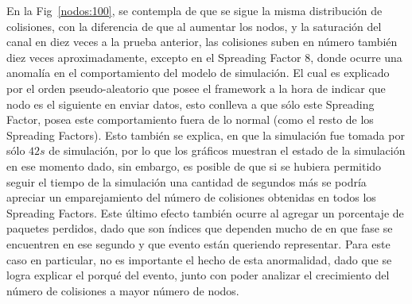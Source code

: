 \begin{justify}
En la Fig~\ref{nodos:100}, se contempla de que se sigue la misma distribución de colisiones, con la diferencia de que al aumentar los nodos, y la saturación del canal en diez veces a la prueba anterior, las colisiones suben en número también diez veces aproximadamente, excepto en el Spreading Factor 8, donde ocurre una anomalía en el comportamiento del modelo de simulación. El cual es explicado por el orden pseudo-aleatorio que posee el framework a la hora de indicar que nodo es el siguiente en enviar datos, esto conlleva a que sólo este Spreading Factor, posea este comportamiento fuera de lo normal (como el resto de los Spreading Factors). Esto también se explica, en que la simulación fue tomada por sólo $42s$ de simulación, por lo que los gráficos muestran el estado de la simulación en ese momento dado, sin embargo, es posible de que si se hubiera permitido seguir el tiempo de la simulación una cantidad de segundos más se podría apreciar un emparejamiento del número de colisiones obtenidas en todos los Spreading Factors. Este último efecto también ocurre al agregar un porcentaje de paquetes perdidos, dado que son índices que dependen mucho de en que fase se encuentren en ese segundo y que evento están queriendo representar. Para este caso en particular, no es importante el hecho de esta anormalidad, dado que se logra explicar el porqué del evento, junto con poder analizar el crecimiento del número de colisiones a mayor número de nodos.
\begin{figure}[!ht]
\centering

\end{figure}
\end{justify}

